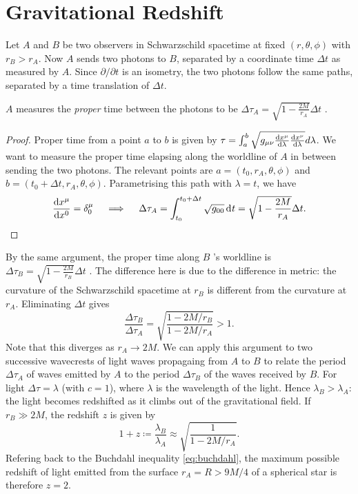 \section{Gravitational Redshift}%
\label{sec:gravitational_redshift}

Let $A$ and $B$ be two observers in Schwarzschild spacetime at fixed $(r, \theta, \phi)$ with $r_B > r_A$.
Now $A$ sends two photons to $B$, separated by a coordinate time $\Delta t$ as measured by  $A$.
Since  $\partial / \partial t$  is an isometry, the two photons follow the same paths, separated by a time translation of $\Delta t$.
\begin{figure}[tbhp]
  \centering
  \def\svgwidth{0.5\columnwidth}
  
  \caption{}
  \label{fig:l3f1}
\end{figure}
\begin{claim}
  $A$ measures the \emph{proper} time between the photons to be $\Delta \tau_{A} = \sqrt{1 - \frac{2M}{r_A}} \Delta t$ .
\end{claim}
\begin{proof}
  Proper time from a point $a$  to $b$  is given by $\tau = \int_a^b \sqrt{g_{\mu\nu} \dv{x^{\mu}}{\lambda} \dv{x^{\nu}}{\lambda}} d\lambda $.
  We want to measure the proper time elapsing along the worldline of $A$ in between sending the two photons. The relevant points are $a = (t_0, r_A, \theta, \phi)$ and $b = (t_0 + \Delta t, r_A, \theta, \phi)$.
  Parametrising this path with $\lambda = t$, we have
  \begin{equation}
    \dv{x^{\mu}}{x^0} = \delta^{\mu}_0 \quad \implies \quad
    \Delta \tau_A = \int_{t_0}^{t_0 + \Delta t} \sqrt{g_{00}} \dd[]{t} = \sqrt{1 - \frac{2M}{r_A}} \Delta t.
  \end{equation}
\end{proof}
By the same argument, the proper time along $B$ 's worldline is $\Delta \tau_B = \sqrt{1 - \frac{2M}{r_B}} \Delta t$ . The difference here is due to the difference in metric: the curvature of the Schwarzschild spacetime at $r_B$ is different  from the curvature at $r_A$. 
Eliminating $\Delta t$  gives
\begin{equation}
  \frac{\Delta \tau_B}{\Delta \tau_A} = \sqrt{\frac{1 - 2M / r_B}{1 - 2M / r_A}} > 1.
\end{equation}
Note that this diverges as $r_A \to 2M$.
We can apply this argument to two successive wavecrests of light waves propagaing from $A$  to $B$ to relate the period $\Delta \tau_A$ of waves emitted by $A$  to the period $\Delta \tau_B$ of the waves received by  $B$.
For light $\Delta \tau = \lambda$  (with $c = 1$), where $\lambda$  is the wavelength of the light.
Hence $\lambda_B  > \lambda_A$: the light becomes redshifted as it climbs out of the gravitational field.
If $r_B \gg 2M$, the redshift $z$  is given by
\begin{equation}
  1 + z \coloneqq \frac{\lambda_B}{\lambda_A} \approx \sqrt{\frac{1}{1 - 2M / r_A}}.
\end{equation} 
Refering back to the Buchdahl inequality \eqref{eq:buchdahl}, the maximum possible redshift of light emitted from the surface $r_A = R > 9 M / 4$ of a spherical star is therefore $z = 2$.

